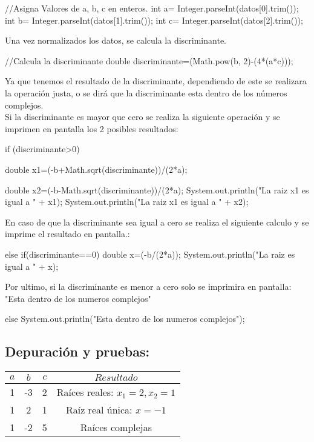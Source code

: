 \begin{javaCode}
    //Asigna Valores de a, b, c en enteros.
        int a= Integer.parseInt(datos[0].trim());
        int b= Integer.parseInt(datos[1].trim());
        int c= Integer.parseInt(datos[2].trim());
        
\end{javaCode}
Una vez normalizados los datos, se calcula la discriminante.
\begin{javaCode}
    //Calcula la discriminante
    double discriminante=(Math.pow(b, 2)-(4*(a*c)));
\end{javaCode}

Ya que tenemos el resultado de la discriminante, dependiendo de este se realizara la operación justa, o se dirá que la discriminante esta dentro de los números complejos.\\
Si la discriminante es mayor que cero se realiza la siguiente operación y se imprimen en pantalla los 2 posibles resultados:
\begin{javaCode}
    if (discriminante>0) {
        double x1=(-b+Math.sqrt(discriminante))/(2*a);
            
        double x2=(-b-Math.sqrt(discriminante))/(2*a);
        System.out.println("La raiz x1 es igual a " + x1);
        System.out.println("La raiz x1 es igual a " + x2);
            
        }
\end{javaCode}
En caso de que la discriminante sea igual a cero se realiza el siguiente calculo y se imprime el resultado en pantalla.:
\begin{javaCode}
    else if(discriminante==0){
            double x=(-b/(2*a));
            System.out.println("La raiz es igual a " + x);
        }
\end{javaCode}
Por ultimo, si la discriminante es menor a cero solo se imprimira en pantalla:\\"Esta dentro de los numeros complejos"
\begin{javaCode}
    else{
            System.out.println("Esta dentro de los numeros complejos");
        }
\end{javaCode}

\subsection{\textbf{Depuración y pruebas:}}
\begin{center}
    \begin{tabular}{|c|c|c|c|}
    \hline
    \textbf{\(a\)} & \textbf{\(b\)} & \textbf{\(c\)} & \textbf{\(Resultado\)} \\
    \hline
    1 & -3 & 2 & Raíces reales: \(x_1 = 2, x_2 = 1\) \\
    \hline
    1 & 2 & 1 & Raíz real única: \(x = -1\) \\
    \hline
    1 & -2 & 5 & Raíces complejas \\
    \hline
    \end{tabular}
    \end{center}
    
    \clearpage